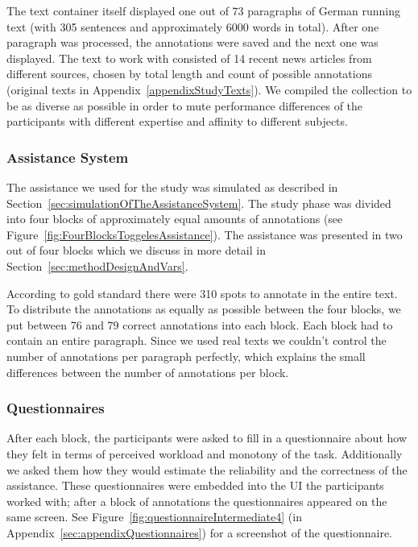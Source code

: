 			The text container itself displayed one out of 73 paragraphs of German running text (with 305 sentences and approximately 6000 words in total). After one paragraph was processed, the annotations were saved and the next one was displayed. The text to work with consisted of 14 recent news articles from different sources, chosen by total length and count of possible annotations (original texts in Appendix~\ref{appendixStudyTexts}). We compiled the collection to be as diverse as possible in order to mute performance differences of the participants with different expertise and affinity to different subjects.

		\subsubsection{Assistance System}
			The assistance we used for the study was simulated as described in Section~\ref{sec:simulationOfTheAssistanceSystem}. The study phase was divided into four blocks of approximately equal amounts of annotations (see Figure~\ref{fig:FourBlocksToggelesAssistance}). The assistance was presented in two out of four blocks which we discuss in more detail in Section~\ref{sec:methodDesignAndVars}.


			According to gold standard there were 310 spots to annotate in the entire text. To distribute the annotations as equally as possible between the four blocks, we put between 76 and 79 correct annotations into each block. Each block had to contain an entire paragraph. Since we used real texts we couldn't control the number of annotations per paragraph perfectly, which explains the small differences between the number of annotations per block.

		\subsubsection{Questionnaires}
			\label{sec:apparatusQuestionnaires}
			After each block, the participants were asked to fill in a questionnaire about how they felt in terms of perceived workload and monotony of the task. Additionally we asked them how they would estimate the reliability and the correctness of the assistance. These questionnaires were embedded into the \ac{UI} the participants worked with; after a block of annotations the questionnaires appeared on the same screen. See Figure~\ref{fig:questionnaireIntermediate4} (in Appendix~\ref{sec:appendixQuestionnaires}) for a screenshot of the questionnaire.

